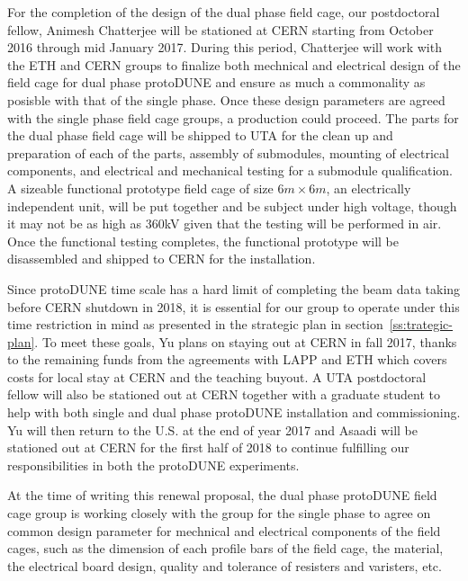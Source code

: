 For the completion of the design of the dual phase field cage, our postdoctoral fellow, Animesh Chatterjee will be stationed at CERN starting from October 2016 through mid January 2017.   During this period, Chatterjee will work with the ETH and CERN groups to finalize both mechnical and electrical design of the field cage for dual phase protoDUNE and ensure as much a commonality as posisble with that of the single phase.  Once these design parameters are agreed with the single phase field cage groups, a production could proceed.  The parts for the dual phase field cage will be shipped to UTA for the clean up and preparation of each of the parts, assembly of submodules, mounting of electrical components, and electrical and mechanical testing for a submodule qualification. A sizeable functional prototype field cage of size $6m\times 6m$, an electrically independent unit, will be put together and be subject under high voltage, though it may not be as high as 360kV given that the testing will be performed in air.  Once the functional testing completes, the functional prototype will be disassembled and shipped to CERN for the installation.

Since protoDUNE time scale has a hard limit of completing the beam data taking before CERN shutdown in 2018, it is essential for our group to operate under this time restriction in mind as presented in the strategic plan in section~\ref{ss:trategic-plan}.  To meet these goals, Yu plans on staying out at CERN in fall 2017, thanks to the remaining funds from the agreements with LAPP and ETH which covers costs for local stay at CERN and the teaching buyout.   A UTA postdoctoral fellow will also be stationed out at CERN together with a graduate student to help with both single and dual phase protoDUNE installation and commissioning.   Yu will then return to the U.S. at the end of year 2017 and Asaadi will be stationed out at CERN for the first half of 2018 to continue fulfilling our responsibilities in both the protoDUNE experiments.

At the time of writing this renewal proposal, the dual phase protoDUNE field cage group is working closely with the group for the single phase to agree on common design parameter for mechnical and electrical components of the field cages, such as the dimension of each profile bars of the field cage, the material, the electrical board design, quality and tolerance of resisters and varisters, etc. 
